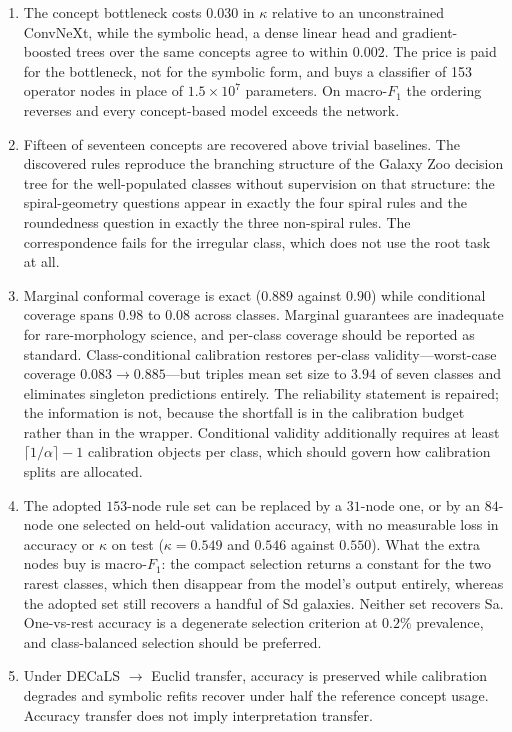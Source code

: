 \documentclass[11pt]{article}
\begin{document}
\begin{enumerate}
\item The concept bottleneck costs $0.030$ in $\kappa$ relative to an
unconstrained ConvNeXt, while the symbolic head, a dense linear head and
gradient-boosted trees over the same concepts agree to within $0.002$. The
price is paid for the bottleneck, not for the symbolic form, and buys a
classifier of 153 operator nodes in place of $1.5\times10^{7}$ parameters. On
macro-$F_1$ the ordering reverses and every concept-based model exceeds the
network.
\item Fifteen of seventeen concepts are recovered above trivial baselines. The
discovered rules reproduce the branching structure of the Galaxy Zoo decision
tree for the well-populated classes without supervision on that structure:
the spiral-geometry questions appear in exactly the four spiral rules and the
roundedness question in exactly the three non-spiral rules. The correspondence
fails for the irregular class, which does not use the root task at all.
\item Marginal conformal coverage is exact ($0.889$ against $0.90$) while
conditional coverage spans $0.98$ to $0.08$ across classes. Marginal
guarantees are inadequate for rare-morphology science, and per-class coverage
should be reported as standard. Class-conditional calibration restores
per-class validity---worst-case coverage $0.083 \rightarrow 0.885$---but
triples mean set size to $3.94$ of seven classes and eliminates singleton
predictions entirely. The reliability statement is repaired; the information is
not, because the shortfall is in the calibration budget rather than in the
wrapper. Conditional validity additionally requires at least
$\lceil 1/\alpha \rceil - 1$ calibration objects per class, which should govern
how calibration splits are allocated.
\item The adopted $153$-node rule set can be replaced by a $31$-node one, or by an
$84$-node one selected on held-out validation accuracy, with no measurable loss
in accuracy or $\kappa$ on test ($\kappa = 0.549$ and $0.546$ against
$0.550$). What the extra nodes buy is
macro-$F_1$: the compact selection returns a constant for the two rarest
classes, which then disappear from the model's output entirely, whereas the
adopted set still recovers a handful of Sd galaxies. Neither set recovers Sa.
One-vs-rest accuracy is a degenerate selection criterion at
$0.2\%$ prevalence, and class-balanced selection should be preferred.
\item Under DECaLS $\rightarrow$ Euclid transfer, accuracy is preserved while
calibration degrades and symbolic refits recover under half the reference
concept usage. Accuracy transfer does not imply interpretation transfer.
\end{enumerate}
\end{document}

